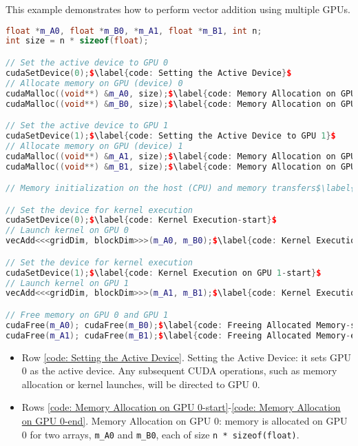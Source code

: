 \highspace
\begin{examplebox}
  This example demonstrates how to perform vector addition using multiple GPUs.
  \begin{lstlisting}[language=C++, mathescape=true]
float *m_A0, float *m_B0, *m_A1, float *m_B1, int n;
int size = n * sizeof(float);

// Set the active device to GPU 0
cudaSetDevice(0);$\label{code: Setting the Active Device}$
// Allocate memory on GPU (device) 0
cudaMalloc((void**) &m_A0, size);$\label{code: Memory Allocation on GPU 0-start}$
cudaMalloc((void**) &m_B0, size);$\label{code: Memory Allocation on GPU 0-end}$

// Set the active device to GPU 1
cudaSetDevice(1);$\label{code: Setting the Active Device to GPU 1}$
// Allocate memory on GPU (device) 1
cudaMalloc((void**) &m_A1, size);$\label{code: Memory Allocation on GPU 1-start}$
cudaMalloc((void**) &m_B1, size);$\label{code: Memory Allocation on GPU 1-end}$

// Memory initialization on the host (CPU) and memory transfers$\label{code: Memory Initialization and Transfers}$

// Set the device for kernel execution
cudaSetDevice(0);$\label{code: Kernel Execution-start}$
// Launch kernel on GPU 0
vecAdd<<<gridDim, blockDim>>>(m_A0, m_B0);$\label{code: Kernel Execution-end}$

// Set the device for kernel execution
cudaSetDevice(1);$\label{code: Kernel Execution on GPU 1-start}$
// Launch kernel on GPU 1
vecAdd<<<gridDim, blockDim>>>(m_A1, m_B1);$\label{code: Kernel Execution on GPU 1-end}$

// Free memory on GPU 0 and GPU 1
cudaFree(m_A0); cudaFree(m_B0);$\label{code: Freeing Allocated Memory-start}$
cudaFree(m_A1); cudaFree(m_B1);$\label{code: Freeing Allocated Memory-end}$\end{lstlisting}

  \begin{itemize}
    \item Row \ref{code: Setting the Active Device}. Setting the Active Device: it sets GPU 0 as the active device. Any subsequent CUDA operations, such as memory allocation or kernel launches, will be directed to GPU 0.

    \item Rows \ref{code: Memory Allocation on GPU 0-start}-\ref{code: Memory Allocation on GPU 0-end}. Memory Allocation on GPU 0: memory is allocated on GPU 0 for two arrays, \texttt{m\_A0} and \texttt{m\_B0}, each of size \texttt{n * sizeof(float)}.


\end{itemize}
\end{examplebox}
